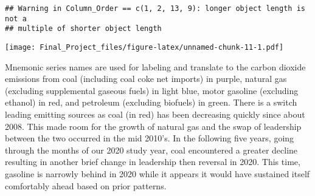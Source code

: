 \documentclass[
]{article}
\newenvironment{Shaded}{\begin{snugshade}}{\end{snugshade}}
\newcommand{\CommentTok}[1]{\textcolor[rgb]{0.56,0.35,0.01}{\textit{#1}}}
\newcommand{\DataTypeTok}[1]{\textcolor[rgb]{0.13,0.29,0.53}{#1}}
\newcommand{\DecValTok}[1]{\textcolor[rgb]{0.00,0.00,0.81}{#1}}
\newcommand{\FloatTok}[1]{\textcolor[rgb]{0.00,0.00,0.81}{#1}}
\newcommand{\KeywordTok}[1]{\textcolor[rgb]{0.13,0.29,0.53}{\textbf{#1}}}
\newcommand{\NormalTok}[1]{#1}
\newcommand{\OperatorTok}[1]{\textcolor[rgb]{0.81,0.36,0.00}{\textbf{#1}}}
\newcommand{\StringTok}[1]{\textcolor[rgb]{0.31,0.60,0.02}{#1}}
\begin{document}
\begin{Shaded}
\end{Shaded}

\begin{verbatim}
## Warning in Column_Order == c(1, 2, 13, 9): longer object length is not a
## multiple of shorter object length
\end{verbatim}

\texttt{[image: Final\_Project\_files/figure-latex/unnamed-chunk-11-1.pdf]}

Mnemonic series names are used for labeling and translate to the carbon
dioxide emissions from coal (including coal coke net imports) in purple,
natural gas (excluding supplemental gaseous fuels) in light blue, motor
gasoline (excluding ethanol) in red, and petroleum (excluding biofuels)
in green. There is a switch leading emitting sources as coal (in red)
has been decreasing quickly since about 2008. This made room for the
growth of natural gas and the swap of leadership between the two
occurred in the mid 2010's. In the following five years, going through
the months of our 2020 study year, coal encountered a greater decline
resulting in another brief change in leadership then reversal in 2020.
This time, gasoline is narrowly behind in 2020 while it appears it would
have sustained itself comfortably ahead based on prior patterns.
\end{document}
